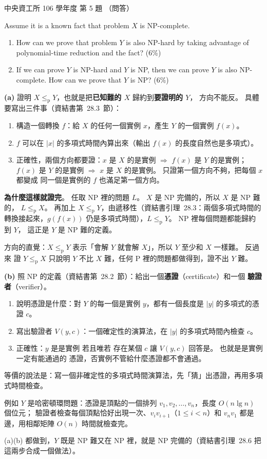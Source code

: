 \begin{pastexam}[label={px:ncu-106-dsa-05}]{中央資工所 106 學年度 第 5 題}
（問答）

Assume it is a known fact that problem $X$ is NP-complete.
\begin{enumerate}[label=(\alph*)]
\item How can we prove that problem $Y$ is also NP-hard by taking advantage of polynomial-time
reduction and the fact? (6\%)
\item If we can prove $Y$ is NP-hard and $Y$ is NP, then we can prove $Y$ is also NP-complete.
How can we prove that $Y$ is NP? (6\%)
\end{enumerate}
\end{pastexam}

\begin{pastsoln}
\textbf{(a)} 證明 $X \le_{\mathrm{p}} Y$，也就是把\textbf{已知難的 $X$} 歸約到\textbf{要證明的 $Y$}，
方向不能反。 具體要寫出三件事（資結書第~28.3~節）：
\begin{enumerate}
\item 構造一個轉換 $f$：給 $X$ 的任何一個實例 $x$，產生 $Y$ 的一個實例 $f(x)$。
\item $f$ 可以在 $|x|$ 的多項式時間內算出來（輸出 $f(x)$ 的長度自然也是多項式）。
\item 正確性，兩個方向都要證：$x$ 是 $X$ 的是實例 $\Rightarrow$ $f(x)$ 是 $Y$ 的是實例；
$f(x)$ 是 $Y$ 的是實例 $\Rightarrow$ $x$ 是 $X$ 的是實例。 只證第一個方向不夠，把每個 $x$ 都變成
同一個是實例的 $f$ 也滿足第一個方向。
\end{enumerate}
\textbf{為什麼這樣就證完}。 任取 NP 裡的問題 $L$。 $X$ 是 NP 完備的，所以 $X$ 是 NP 難的，
$L \le_{\mathrm{p}} X$。 再加上 $X \le_{\mathrm{p}} Y$，由遞移性（資結書引理~28.3：兩個多項式時間的
轉換接起來，$g(f(x))$ 仍是多項式時間），$L \le_{\mathrm{p}} Y$。 NP 裡每個問題都能歸約到 $Y$，
這正是 $Y$ 是 NP 難的定義。

方向的直覺：$X \le_{\mathrm{p}} Y$ 表示「會解 $Y$ 就會解 $X$」，所以 $Y$ 至少和 $X$ 一樣難。 反過來
證 $Y \le_{\mathrm{p}} X$ 只說明 $Y$ 不比 $X$ 難，任何 P 裡的問題都做得到，證不出 $Y$ 難。

\textbf{(b)} 照 NP 的定義（資結書第~28.2~節）：給出一個\textbf{憑證}（certificate）和一個
\textbf{驗證者}（verifier）。
\begin{enumerate}
\item 說明憑證是什麼：對 $Y$ 的每一個是實例 $y$，都有一個長度是 $|y|$ 的多項式的憑證 $c$。
\item 寫出驗證者 $V(y, c)$：一個確定性的演算法，在 $|y|$ 的多項式時間內檢查 $c$。
\item 正確性：$y$ 是是實例 若且唯若 存在某個 $c$ 讓 $V(y, c)$ 回答是。 也就是是實例一定有能通過的
憑證，否實例不管給什麼憑證都不會通過。
\end{enumerate}
等價的說法是：寫一個非確定性的多項式時間演算法，先「猜」出憑證，再用多項式時間檢查。

例如 $Y$ 是哈密頓環問題：憑證是頂點的一個排列 $v_1, v_2, \ldots, v_n$，長度 $O(n \lg n)$ 個位元；
驗證者檢查每個頂點恰好出現一次、$v_i v_{i+1}$（$1 \le i < n$）和 $v_n v_1$ 都是邊，用相鄰矩陣
$O(n)$ 時間就檢查完。

(a)(b) 都做到，$Y$ 既是 NP 難又在 NP 裡，就是 NP 完備的（資結書引理~28.6 把這兩步合成一個做法）。
\end{pastsoln}
